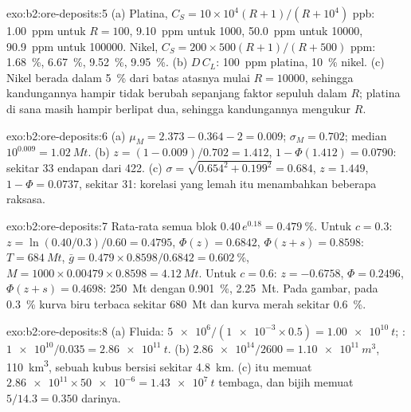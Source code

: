 \begin{solution}{exo:b2:ore-deposits:5}
(a) Platina, $C_S = 10 \times 10^4 (R + 1)/(R + 10^4)$ ppb: \qty{1.00}{ppm} untuk $R = 100$,
\qty{9.10}{ppm} untuk \num{1000}, \qty{50.0}{ppm} untuk \num{10000}, \qty{90.9}{ppm} untuk \num{100000}.
Nikel, $C_S = 200 \times 500 (R + 1)/(R + 500)$ ppm: \qty{1.68}{\percent}, \qty{6.67}{\percent},
\qty{9.52}{\percent}, \qty{9.95}{\percent}. (b) $D\,C_L$: \qty{100}{ppm} platina,
\qty{10}{\percent} nikel. (c) Nikel berada dalam \qty{5}{\percent} dari batas atasnya mulai
$R = \num{10000}$, sehingga kandungannya hampir tidak berubah sepanjang faktor sepuluh dalam $R$; platina di sana masih
hampir berlipat dua, sehingga kandungannya mengukur $R$.
\end{solution}

\begin{solution}{exo:b2:ore-deposits:6}
(a) $\mu_M = 2.373 - 0.364 - 2 = 0.009$; $\sigma_M = 0.702$; median $10^{0.009} = \qty{1.02}{Mt}$.
(b) $z = (1 - 0.009)/0.702 = 1.412$, $1 - \Phi(1.412) = 0.0790$: sekitar 33 endapan dari 422.
(c) $\sigma = \sqrt{0.654^2 + 0.199^2} = 0.684$, $z = 1.449$, $1 - \Phi = 0.0737$, sekitar 31: korelasi
yang lemah itu menambahkan beberapa raksasa.
\end{solution}

\begin{solution}{exo:b2:ore-deposits:7}
Rata-rata semua blok $0.40\,e^{0.18} = \qty{0.479}{\percent}$. Untuk $c = 0.3$: $z = \ln(0.40/0.3)/0.60 =
0.4795$, $\Phi(z) = 0.6842$, $\Phi(z + s) = 0.8598$: $T = \qty{684}{Mt}$, $\bar g = 0.479 \times
0.8598/0.6842 = \qty{0.602}{\percent}$, $M = 1000 \times 0.00479 \times 0.8598 = \qty{4.12}{Mt}$.
Untuk $c = 0.6$: $z = -0.6758$, $\Phi = 0.2496$, $\Phi(z + s) = 0.4698$: \qty{250}{Mt} dengan
\qty{0.901}{\percent}, \qty{2.25}{Mt}. Pada gambar, pada  \qty{0.3}{\percent} kurva biru
terbaca sekitar \qty{680}{Mt} dan kurva merah sekitar \qty{0.6}{\percent}.
\end{solution}

\begin{solution}{exo:b2:ore-deposits:8}
(a) Fluida: $\num{5e6}/(\num{1e-3} \times 0.5) = \qty{1.00e10}{t}$; : $\num{1e10}/0.035 =
\qty{2.86e11}{t}$. (b) $\num{2.86e14}/2600 = \qty{1.10e11}{m^3}$, \qty{110}{km^3}, sebuah kubus 
bersisi sekitar \qty{4.8}{km}. (c)  itu memuat $\num{2.86e11}
\times \num{50e-6} = \qty{1.43e7}{t}$ tembaga, dan bijih memuat $5/14.3 = 0.350$ darinya.
\end{solution}


